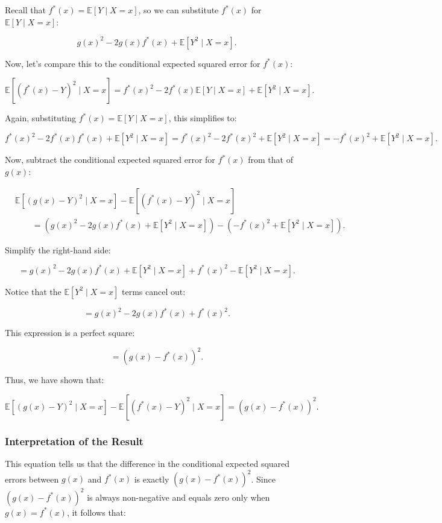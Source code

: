 \begin{notechapter}
Recall that \( f^*(x) = \mathbb{E}[Y \mid X = x] \), so we can substitute \( f^*(x) \) for \( \mathbb{E}[Y \mid X = x] \):

\[
g(x)^2 - 2g(x)f^*(x) + \mathbb{E}[Y^2 \mid X = x].
\]

Now, let's compare this to the conditional expected squared error for \( f^*(x) \):

\[
\mathbb{E}[(f^*(x) - Y)^2 \mid X = x] = f^*(x)^2 - 2f^*(x)\mathbb{E}[Y \mid X = x] + \mathbb{E}[Y^2 \mid X = x].
\]

Again, substituting \( f^*(x) = \mathbb{E}[Y \mid X = x] \), this simplifies to:

\[
f^*(x)^2 - 2f^*(x)f^*(x) + \mathbb{E}[Y^2 \mid X = x] = f^*(x)^2 - 2f^*(x)^2 + \mathbb{E}[Y^2 \mid X = x] = -f^*(x)^2 + \mathbb{E}[Y^2 \mid X = x].
\]

Now, subtract the conditional expected squared error for \( f^*(x) \) from that of \( g(x) \):

\begin{align*}
&\mathbb{E}[(g(x) - Y)^2 \mid X = x] - \mathbb{E}[(f^*(x) - Y)^2 \mid X = x] \\
&\qquad= \left( g(x)^2 - 2g(x)f^*(x) + \mathbb{E}[Y^2 \mid X = x] \right) - \left( -f^*(x)^2 + \mathbb{E}[Y^2 \mid X = x] \right).
\end{align*}

Simplify the right-hand side:

\[
= g(x)^2 - 2g(x)f^*(x) + \mathbb{E}[Y^2 \mid X = x] + f^*(x)^2 - \mathbb{E}[Y^2 \mid X = x].
\]

Notice that the \( \mathbb{E}[Y^2 \mid X = x] \) terms cancel out:

\[
= g(x)^2 - 2g(x)f^*(x) + f^*(x)^2.
\]

This expression is a perfect square:

\[
= (g(x) - f^*(x))^2.
\]

Thus, we have shown that:

\[
\mathbb{E}[(g(x) - Y)^2 \mid X = x] - \mathbb{E}[(f^*(x) - Y)^2 \mid X = x] = (g(x) - f^*(x))^2.
\]

\subsubsection{Interpretation of the Result}

This equation tells us that the difference in the conditional expected squared errors between \( g(x) \) and \( f^*(x) \) is exactly \( (g(x) - f^*(x))^2 \). Since \( (g(x) - f^*(x))^2 \) is always non-negative and equals zero only when \( g(x) = f^*(x) \), it follows that:


\end{notechapter}
